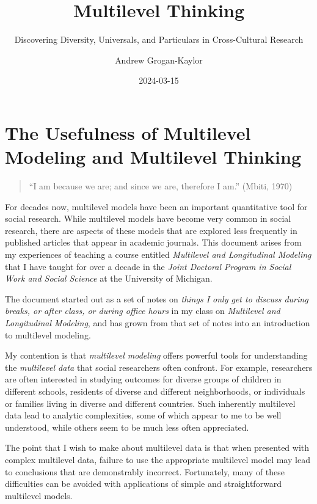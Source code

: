 \documentclass[
  letterpaper,
  DIV=11,
  numbers=noendperiod]{scrreprt}
\title{Multilevel Thinking}
\subtitle{Discovering Diversity, Universals, and Particulars in
Cross-Cultural Research}
\author{Andrew Grogan-Kaylor}
\date{2024-03-15}
\renewcommand*\contentsname{Table of contents}
\newcommand\contentsname{Table of contents}
\begin{document}
\maketitle

\renewcommand*\contentsname{Table of contents}
{
\hypersetup{linkcolor=}
\setcounter{tocdepth}{2}
\tableofcontents
}
\listoffigures
\listoftables
{}

\chapter{The Usefulness of Multilevel Modeling and Multilevel
Thinking}\label{the-usefulness-of-multilevel-modeling-and-multilevel-thinking}

\begin{quote}
``I am because we are; and since we are, therefore I am.'' (Mbiti, 1970)
\end{quote}

For decades now, multilevel models have been an important quantitative
tool for social research. While multilevel models have become very
common in social research, there are aspects of these models that are
explored less frequently in published articles that appear in academic
journals. This document arises from my experiences of teaching a course
entitled \emph{Multilevel and Longitudinal Modeling} that I have taught
for over a decade in the \emph{Joint Doctoral Program in Social Work and
Social Science} at the University of Michigan.

The document started out as a set of notes on \emph{things I only get to
discuss during breaks, or after class, or during office hours} in my
class on \emph{Multilevel and Longitudinal Modeling}, and has grown from
that set of notes into an introduction to multilevel modeling.

My contention is that \emph{multilevel modeling} offers powerful tools
for understanding the \emph{multilevel data} that social researchers
often confront. For example, researchers are often interested in
studying outcomes for diverse groups of children in different schools,
residents of diverse and different neighborhoods, or individuals or
families living in diverse and different countries. Such inherently
multilevel data lead to analytic complexities, some of which appear to
me to be well understood, while others seem to be much less often
appreciated.

The point that I wish to make about multilevel data is that when
presented with complex multilevel data, failure to use the appropriate
multilevel model may lead to conclusions that are demonstrably
incorrect. Fortunately, many of these difficulties can be avoided with
applications of simple and straightforward multilevel models.
\end{document}
